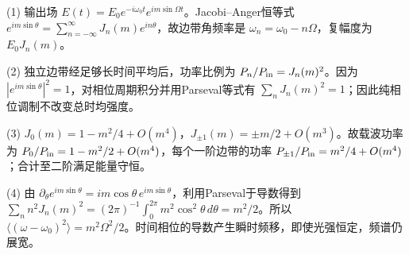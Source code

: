 (1) 输出场 \(E(t)=E_0e^{-i\omega_0t}e^{im\sin\Omega t}\)。Jacobi–Anger恒等式 \(e^{im\sin\theta}=\sum_{n=-\infty}^\infty J_n(m)e^{in\theta}\)，故边带角频率是 \(\omega_n=\omega_0-n\Omega\)，复幅度为 \(E_0J_n(m)\)。

(2) 独立边带经足够长时间平均后，功率比例为 \(P_n/P_{\rm in}=J_n(m)^2\)。因为 \(|e^{im\sin\theta}|^2=1\)，对相位周期积分并用Parseval等式有 \(\boxed{\sum_nJ_n(m)^2=1}\)；因此纯相位调制不改变总时均强度。

(3) \(J_0(m)=1-m^2/4+O(m^4)\)，\(J_{\pm1}(m)=\pm m/2+O(m^3)\)。故载波功率为 \(P_0/P_{\rm in}=1-m^2/2+O(m^4)\)，每个一阶边带的功率 \(P_{\pm1}/P_{\rm in}=m^2/4+O(m^4)\)；合计至二阶满足能量守恒。

(4) 由 \(\partial_\theta e^{im\sin\theta}=im\cos\theta\,e^{im\sin\theta}\)，利用Parseval于导数得到 \(\sum_n n^2J_n(m)^2=(2\pi)^{-1}\int_0^{2\pi}m^2\cos^2\theta\,d\theta=m^2/2\)。所以 \(\boxed{\langle(\omega-\omega_0)^2\rangle=m^2\Omega^2/2}\)。时间相位的导数产生瞬时频移，即使光强恒定，频谱仍展宽。
